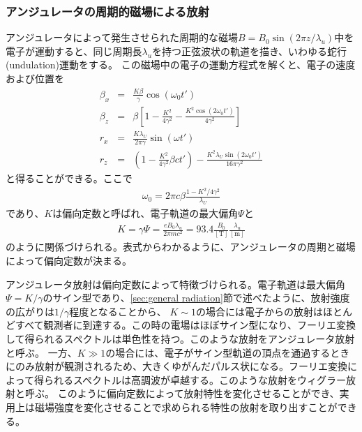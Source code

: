 \documentclass[a4paper,11pt,uplatex]{jsbook}
\begin{document}
\subsubsection{アンジュレータの周期的磁場による放射}\label{sec:undulator radiation}
アンジュレータによって発生させられた周期的な磁場$B = B_0 \sin(2\pi z/\lambda_u)$中を電子が運動すると、同じ周期長$\lambda_u$を持つ正弦波状の軌道を描き、いわゆる蛇行(undulation)運動をする。
この磁場中の電子の運動方程式を解くと、電子の速度および位置を
\begin{eqnarray}\label{eq:undulator motion}
  \beta_x &=& \frac{K\beta}{\gamma}\cos(\omega_0 t')\\
  \beta_z &=& \beta\left[1 - \frac{K^2}{4\gamma^2} -\frac{K^2\cos (2\omega_0 t')}{4\gamma^2} \right]\\
  r_x &=& \frac{K\lambda_U}{2\pi \gamma}\sin(\omega t')\\
  r_z &=& \left(1-\frac{K^2}{4\gamma^2}\beta c t'\right) - \frac{K^2\lambda_U \sin(2\omega_0 t')}{16\pi \gamma^2}
\end{eqnarray}
と得ることができる。ここで
\begin{eqnarray}
  \omega_0 = 2\pi c\beta \frac{1-K^2/4\gamma^2}{\lambda_U}
\end{eqnarray}
であり、$K$は偏向定数と呼ばれ、電子軌道の最大偏角$\Psi$と
\begin{eqnarray}
  K = \gamma \Psi = \frac{eB_0\lambda_u}{2\pi m c^2} = 93.4 \frac{B_0}{[\text{T}]}\frac{\lambda_u}{[\text{m}]}
\end{eqnarray}
のように関係づけられる。表式からわかるように、アンジュレータの周期と磁場によって偏向定数が決まる。

アンジュレータ放射は偏向定数によって特徴づけられる。電子軌道は最大偏角$\Psi = K/\gamma$のサイン型であり、\ref{sec:general radiation}節で述べたように、放射強度の広がりは$1/\gamma$程度となることから、
$K \sim 1$の場合には電子からの放射はほとんどすべて観測者に到達する。この時の電場はほぼサイン型になり、フーリエ変換して得られるスペクトルは単色性を持つ。このような放射をアンジュレータ放射と呼ぶ。
一方、$K \gg 1$の場合には、電子がサイン型軌道の頂点を通過するときにのみ放射が観測されるため、大きくゆがんだパルス状になる。フーリエ変換によって得られるスペクトルは高調波が卓越する。このような放射をウィグラー放射と呼ぶ。
このように偏向定数によって放射特性を変化させることができ、実用上は磁場強度を変化させることで求められる特性の放射を取り出すことができる。
\end{document}

